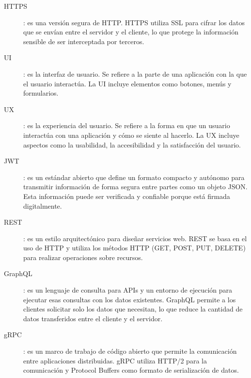 \begin{description}
    \item [\hypertarget{https}{HTTPS}]: es una versión segura de HTTP. HTTPS utiliza SSL para cifrar los datos que se envían entre el servidor y el cliente, lo que protege la información sensible de ser interceptada por terceros.
    \item [\hypertarget{ui}{UI}]: es la interfaz de usuario. Se refiere a la parte de una aplicación con la que el usuario interactúa. La UI incluye elementos como botones, menús y formularios.
    \item [\hypertarget{ux}{UX}]: es la experiencia del usuario. Se refiere a la forma en que un usuario interactúa con una aplicación y cómo se siente al hacerlo. La UX incluye aspectos como la usabilidad, la accesibilidad y la satisfacción del usuario.
    \item [\hypertarget{jwt}{JWT}]: es un estándar abierto que define un formato compacto y autónomo para transmitir información de forma segura entre partes como un objeto JSON. Esta información puede ser verificada y confiable porque está firmada digitalmente.
    \item [\hypertarget{rest}{REST}]: es un estilo arquitectónico para diseñar servicios web. REST se basa en el uso de HTTP y utiliza los métodos HTTP (GET, POST, PUT, DELETE) para realizar operaciones sobre recursos.
    \item [\hypertarget{graphql}{GraphQL}]: es un lenguaje de consulta para APIs y un entorno de ejecución para ejecutar esas consultas con los datos existentes. GraphQL permite a los clientes solicitar solo los datos que necesitan, lo que reduce la cantidad de datos transferidos entre el cliente y el servidor.
    \item [\hypertarget{grpc}{gRPC}]: es un marco de trabajo de código abierto que permite la comunicación entre aplicaciones distribuidas. gRPC utiliza HTTP/2 para la comunicación y Protocol Buffers como formato de serialización de datos.
\end{description}

\endinput